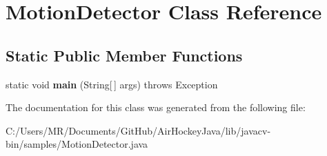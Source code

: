 \hypertarget{class_motion_detector}{}\section{Motion\+Detector Class Reference}
\label{class_motion_detector}
\subsection*{Static Public Member Functions}
\begin{DoxyCompactItemize}
\item 
\hypertarget{class_motion_detector_a41350eff14f30f401c48bf92b40b657f}{}static void {\bfseries main} (String\mbox{[}$\,$\mbox{]} args)  throws Exception \label{class_motion_detector_a41350eff14f30f401c48bf92b40b657f}

\end{DoxyCompactItemize}


The documentation for this class was generated from the following file\+:\begin{DoxyCompactItemize}
\item 
C\+:/\+Users/\+M\+R/\+Documents/\+Git\+Hub/\+Air\+Hockey\+Java/lib/javacv-\/bin/samples/Motion\+Detector.\+java\end{DoxyCompactItemize}
